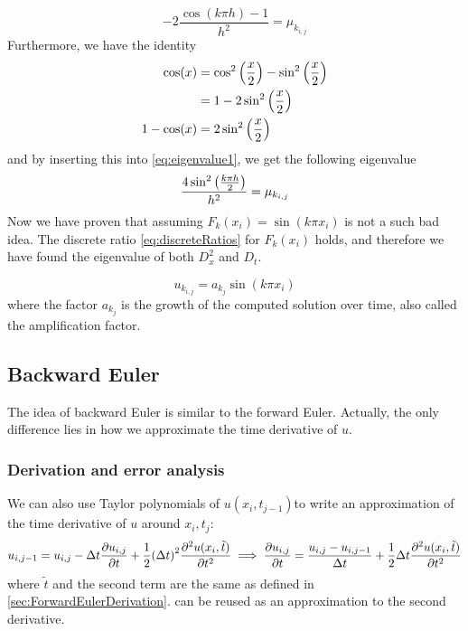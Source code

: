 \documentclass[12pt,english,a4paper]{article}
\begin{document}
\begin{equation}\label{eq:eigenvalue1}
-2\frac{\cos(k\pi h) - 1}{h^2} =\mu_{k_{i,j}}
\end{equation}
Furthermore, we have the identity
\begin{align*}
\cos(x) &= \cos^2\qty(\frac{x}{2}) - \sin^2\qty(\frac{x}{2}) \\
&= 1- 2\sin^2\qty(\frac{x}{2}) \\
1-\cos(x) &= 2\sin^2\qty(\frac{x}{2})
\end{align*}
and by inserting this into \vref{eq:eigenvalue1}, we get the following eigenvalue
\[
\frac{4\sin^2\qty(\frac{k\pi h}{2})}{h^2} =\mu_{k_{i,j}}
\]
Now we have proven that assuming \(F_k(x_i) = \sin(k\pi x_i)\) is not a such bad idea. The discrete ratio \vref{eq:discreteRatios} for \(F_k(x_i)\) holds, and therefore we have found the eigenvalue of both \(D_x^2\) and \(D_t\). \\

\[
u_{k_{i,j}} = a_{k_{j}}\sin(k \pi x_i)
\]
where the factor \(a_{k_j}\) is the growth of the computed solution over time, also called the amplification factor. 
%
\subsection{Backward Euler} \label{sec:backwardEuler}
The idea of backward Euler is similar to the forward Euler. Actually, the only difference lies in how we approximate the time derivative of \(u\).
\subsubsection{Derivation and error analysis}
We can also use Taylor polynomials of \(u(x_i,t_{j-1})\)to write an approximation of the time derivative of \(u\) around \(x_i,t_j\):
\[
    u_{i,j-1} = u_{i,j} - \Delta t\pdv{u_{i,j}}{t} + \frac{1}{2}\qty(\Delta t)^2\pdv[2]{u(x_i,\tilde{t})}{t}
    \implies \pdv{u_{i,j}}{t} = \frac{u_{i,j}-u_{i,j-1}}{\Delta t} + \frac{1}{2}\Delta t\pdv[2]{u(x_i,\tilde{t})}{t}
\]
where \(\tilde{t}\) and the second term are the same as defined in \vref{sec:ForwardEulerDerivation}.  can be reused as an approximation to the second derivative.
\end{document}
